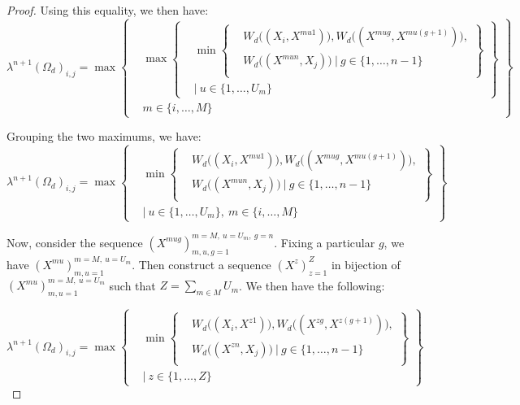 \documentclass{article} %
\theoremstyle{style1}
\theoremstyle{style1}
\theoremstyle{example}
\begin{document}
\begin{proof}
Using this equality, we then have:
\[
\lambda^{n+1}(\Omega_d)_{i,j} =\max
\left\{
  \begin{aligned}
  &\max
          \left\{
          \begin{aligned}
            &\min\left\{
            \begin{aligned}
            &W_d\big((X_i,X^{mu1})\big), W_d\big((X^{mug},X^{mu(g+1)})\big), \\
            &W_d\big((X^{mun},X_j)\big)\ |\ g\in\{1,\ldots,n-1\}\\
            \end{aligned}
            \right\} \\
            &|\ u\in\{1,\ldots,U_m\}
          \end{aligned}
          \right\} \\
  & m\in\{i,\ldots,M\}
  \end{aligned}
\right\}
\]

Grouping the two maximums, we have:
\[
\lambda^{n+1}(\Omega_d)_{i,j} =\max
\left\{
  \begin{aligned}
            &\min\left\{
            \begin{aligned}
            &W_d\big((X_i,X^{mu1})\big), W_d\big((X^{mug},X^{mu(g+1)})\big), \\
            &W_d\big((X^{mun},X_j)\big)\ |\ g\in\{1,\ldots,n-1\}\\
            \end{aligned}
            \right\} \\
            &|\ u\in\{1,\ldots,U_m\},\ m\in\{i,\ldots,M\}
  \end{aligned}
\right\}
\]

Now, consider the sequence $(X^{mug})_{m,u,g=1}^{m=M,\ u=U_m,\ g=n}$. Fixing a particular $g$, we have $(X^{mu})_{m,u=1}^{m=M,\ u=U_m}$. Then construct a sequence $(X^z)_{z=1}^Z$ in bijection of $(X^{mu})_{m,u=1}^{m=M,\ u=U_m}$ such that $Z=\sum_{m\in M}U_m$. We then have the following: 

\[
\lambda^{n+1}(\Omega_d)_{i,j} =\max
\left\{
  \begin{aligned}
            &\min\left\{
            \begin{aligned}
            &W_d\big((X_i,X^{z1})\big), W_d\big((X^{zg},X^{z(g+1)})\big), \\
            &W_d\big((X^{zn},X_j)\big)\ |\ g\in\{1,\ldots,n-1\}\\
            \end{aligned}
            \right\} \\
            &|\ z\in\{1,\ldots,Z\}
  \end{aligned}
\right\}
\]


\end{proof}
\end{document}

